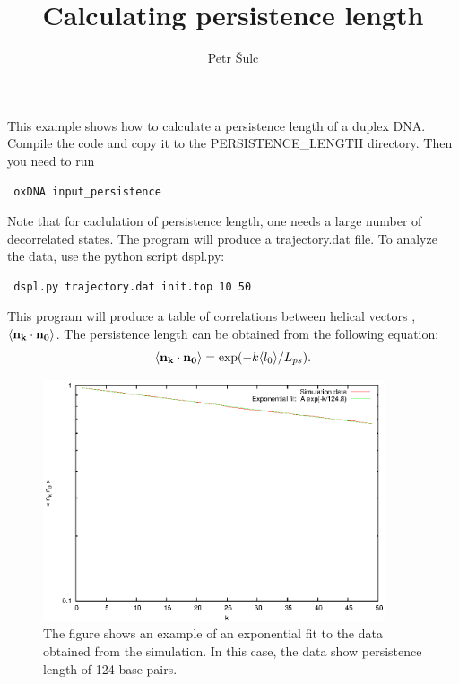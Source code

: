 \documentclass[a4paper,11pt]{article}
\title{Calculating persistence length}
\author{Petr \v{S}ulc}
\begin{document}
\maketitle
This example shows how to calculate a persistence length of a duplex DNA. Compile the code and copy it to the PERSISTENCE\_LENGTH directory.
Then you need to run 

\begin{verbatim}
 oxDNA input_persistence
\end{verbatim}

Note that for caclulation of persistence length, one needs a large number of decorrelated states. The program will produce a trajectory.dat file. To analyze the data, use the python script 
dspl.py:
\begin{verbatim}
 dspl.py trajectory.dat init.top 10 50
\end{verbatim}
This program will produce a table of correlations between helical vectors , $\langle {\bf n_k} \cdot {\bf n_0} \rangle$. The persistence length can be obtained from the following equation:
\begin{equation}
\langle {\bf n_k} \cdot {\bf n_0} \rangle = \exp(- k \langle l_0 \rangle /L_{ps}).
\label{exp_decay}
\end{equation}


\begin{figure}
\centering
\includegraphics[width=0.9\textwidth]{ds}
\caption{The figure shows an example of an exponential fit to the data obtained from the simulation. In this case, the data show persistence length of 124 base pairs.}
\label{fig_fray}
\end{figure}
\end{document}
